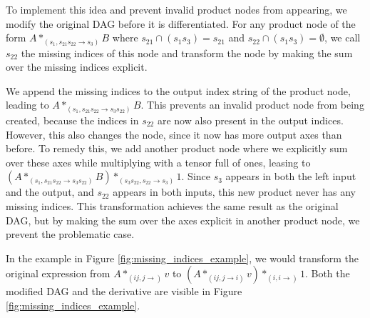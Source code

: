 \documentclass[12pt, a4paper]{report}
\begin{document}
To implement this idea and prevent invalid product nodes from appearing, we modify the original DAG before it is differentiated.
For any product node of the form $A *_{(s_1, s_{21} s_{22} \rightarrow s_3)} B$ where $s_{21} \cap (s_1 s_3) = s_{21}$ and $s_{22} \cap (s_1 s_3) = \emptyset$, we call $s_{22}$ the missing indices of this node and transform the node by making the sum over the missing indices explicit.

We append the missing indices to the output index string of the product node, leading to $A *_{(s_1, s_{21} s_{22} \rightarrow s_3 s_{22})} B$.
This prevents an invalid product node from being created, because the indices in $s_{22}$ are now also present in the output indices.
However, this also changes the node, since it now has more output axes than before.
To remedy this, we add another product node where we explicitly sum over these axes while multiplying with a tensor full of ones, leasing to $(A *_{(s_1, s_{21} s_{22} \rightarrow s_3 s_{22})} B) *_{(s_3 s_{22}, s_{22} \rightarrow s_3)} 1$.
Since $s_3$ appears in both the left input and the output, and $s_{22}$ appears in both inputs, this new product never has any missing indices.
This transformation achieves the same result as the original DAG, but by making the sum over the axes explicit in another product node, we prevent the problematic case.

In the example in Figure \ref{fig:missing_indices_example}, we would transform the original expression from $A *_{(ij,j \rightarrow )} v$ to $(A *_{(ij,j \rightarrow i)} v) *_{(i,i \rightarrow)} 1$.
Both the modified DAG and the derivative are visible in Figure \ref{fig:missing_indices_example}.
\end{document}
